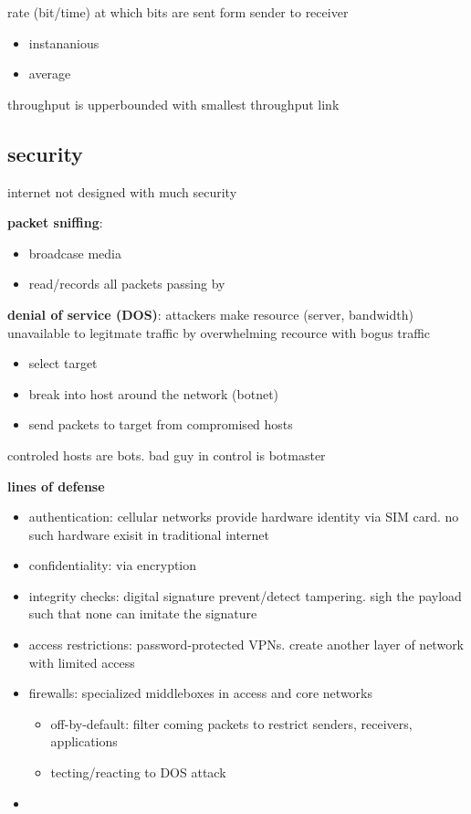 \documentclass[10pt]{article}
\theoremstyle{break}
\begin{document}
rate (bit/time) at which bits are sent form sender to receiver 
\begin{itemize}
    \item instananious 
    \item average 
\end{itemize}

throughput is upperbounded with smallest throughput link
\subsection{security}
internet not designed with much security

\textbf{packet sniffing}: 
\begin{itemize}
    \item broadcase media
    \item read/records all packets passing by
\end{itemize} 

\textbf{denial of service (DOS)}:
attackers make resource (server, bandwidth) unavailable to legitmate traffic by overwhelming recource with bogus traffic
\begin{itemize}
    \item select target 
    \item break into host around the network (botnet)
    \item send packets to target from compromised hosts
\end{itemize}
controled hosts are bots. bad guy in control is botmaster

\textbf{lines of defense}
\begin{itemize}
    \item authentication: cellular networks provide hardware identity via SIM card. no such hardware exisit in traditional internet
    \item confidentiality: via encryption
    \item integrity checks: digital signature prevent/detect tampering. sigh the payload such that none can imitate the signature 
    \item access restrictions: password-protected VPNs. create another layer of network with limited access 
    \item firewalls: specialized middleboxes in access and core networks \begin{itemize}
        \item off-by-default: filter coming packets to restrict senders, receivers, applications 
        \item tecting/reacting to DOS attack
    \end{itemize}
    \item 
\end{itemize}
\end{document}
